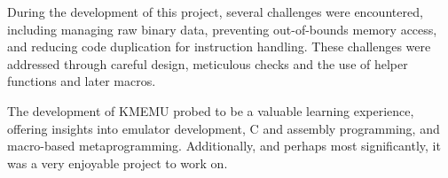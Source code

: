 \documentclass[10pt,a4paper,final]{article}
\begin{document}
During the development of this project, several challenges were encountered,
including managing raw binary data, preventing out-of-bounds memory access, and
reducing code duplication for instruction handling. These challenges were
addressed through careful design, meticulous checks and the use of helper
functions and later macros.

The development of KMEMU probed to be a valuable learning experience, offering
insights into emulator development, C and assembly programming, and macro-based
metaprogramming. Additionally, and perhaps most significantly, it was a very
enjoyable project to work on.
\end{document}
